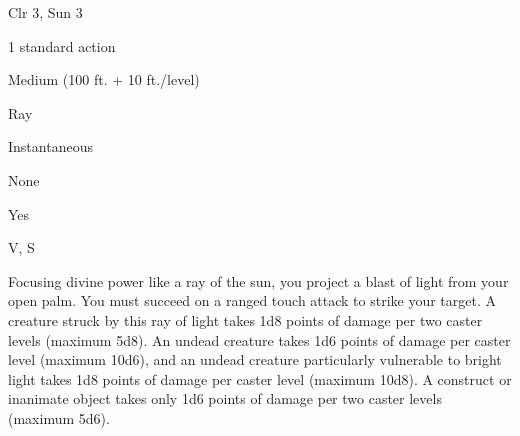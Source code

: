 
\begin{description*}
\item[Level:] Clr 3, Sun 3
\item[Casting Time:] 1 standard action
\item[Range:] Medium (100 ft. + 10 ft./level)
\item[Effect:] Ray
\item[Duration:] Instantaneous
\item[Saving Throw:] None
\item[Spell Resistance:] Yes
\item[Components:] V, S
\end{description*}

Focusing divine power like a ray of the sun, you project a blast of light from
your open palm. You must succeed on a ranged touch attack to strike your target.
A creature struck by this ray of light takes 1d8 points of damage per two caster
levels (maximum 5d8). An undead creature takes 1d6 points of damage per caster
level (maximum 10d6), and an undead creature particularly vulnerable to bright
light takes 1d8 points of damage per caster level (maximum 10d8). A construct or
inanimate object takes only 1d6 points of damage per two caster levels (maximum
5d6).
